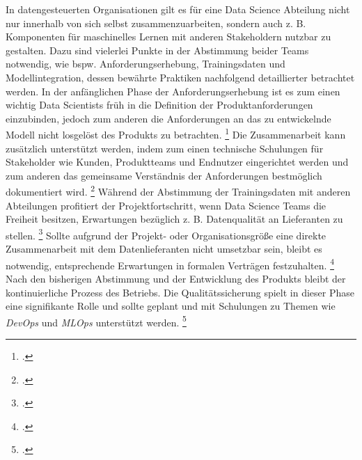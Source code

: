 In datengesteuerten Organisationen gilt es für eine Data Science Abteilung nicht nur innerhalb von sich selbst zusammenzuarbeiten, sondern auch z. B. Komponenten für maschinelles Lernen mit anderen Stakeholdern nutzbar zu gestalten.
Dazu sind vielerlei Punkte in der Abstimmung beider Teams notwendig, wie bspw. Anforderungserhebung, Trainingsdaten und Modellintegration, dessen bewährte Praktiken nachfolgend detaillierter betrachtet werden.
In der anfänglichen Phase der Anforderungserhebung ist es zum einen wichtig Data Scientists früh in die Definition der Produktanforderungen einzubinden, jedoch zum anderen die Anforderungen an das zu entwickelnde Modell nicht losgelöst des Produkts zu betrachten. \footcite[Vgl.][S. 418]{Nahar.2022}
Die Zusammenarbeit kann zusätzlich unterstützt werden, indem zum einen technische Schulungen für Stakeholder wie Kunden, Produktteams und Endnutzer eingerichtet werden und zum anderen das gemeinsame Verständnis der Anforderungen bestmöglich dokumentiert wird. \footcite[Vgl.][S. 418]{Nahar.2022}
Während der Abstimmung der Trainingsdaten mit anderen Abteilungen profitiert der Projektfortschritt, wenn Data Science Teams die Freiheit besitzen, Erwartungen bezüglich z. B. Datenqualität an Lieferanten zu stellen. \footcite[Vgl.][S. 420]{Nahar.2022}
Sollte aufgrund der Projekt- oder Organisationsgröße eine direkte Zusammenarbeit mit dem Datenlieferanten nicht umsetzbar sein, bleibt es notwendig, entsprechende Erwartungen in formalen Verträgen festzuhalten. \footcite[Vgl.][S. 420]{Nahar.2022}
Nach den bisherigen Abstimmung und der Entwicklung des Produkts bleibt der kontinuierliche Prozess des Betriebs.
Die Qualitätssicherung spielt in dieser Phase eine signifikante Rolle und sollte geplant und mit Schulungen zu Themen wie \textit{DevOps} und \textit{MLOps} unterstützt werden. \footcite[Vgl.][S. 423]{Nahar.2022}


